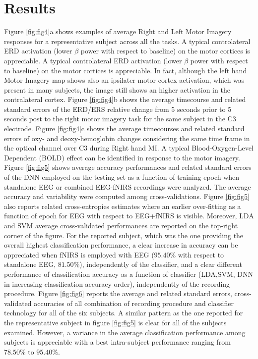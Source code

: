 \documentclass[12pt]{iopart}
\begin{document}
\section{Results}
Figure \ref{fig:fig4}a shows examples of average Right and Left Motor Imagery responses for a representative subject across all the tasks.
A typical controlateral ERD activation (lower $\beta$ power with respect to baseline) on the motor cortices is appreciable.
A typical controlateral ERD activation (lower $\beta$ power with respect to baseline) on the motor cortices is appreciable.
In fact, although the left hand Motor Imagery  map shows also an ipsilater motor cortex activation, which was present in many subjects, the image still shows an higher activation in the contralateral cortex.
Figure \ref{fig:fig4}b shows the average timecourse and related standard errors of the ERD/ERS relative change from 5 seconds prior to 5 seconds post to the right motor imagery task for the same subject in the C3 electrode. Figure \ref{fig:fig4}c shows the average timecourses and related standard errors of oxy- and deoxy-hemoglobin changes considering the same time frame in the optical channel over C3 during Right hand MI. A typical Blood-Oxygen-Level Dependent (BOLD) effect can be identified in response to the motor imagery. 
Figure \ref{fig:fig5} shows average accuracy performances and related standard errors
of the DNN employed on the testing set as a function of training epoch when standalone EEG or combined EEG-fNIRS recordings were analyzed. The average accuracy and variability were computed among cross-validations. 
Figure \ref{fig:fig5} also reports related cross-entropies estimates where an earlier over-fitting as a function of epoch for EEG with respect to EEG+fNIRS is visible.
Moreover, LDA and SVM average cross-validated performances are reported on the top-right corner of the figure.
For the reported subject, which was the one providing the overall highest classification performance, a clear increase in accuracy can be appreciated when fNIRS is employed with EEG ($95.40\%$ with respect to standalone EEG, $81.50\%$), independently of the classifier, and a clear different performance of classification accuracy as a function of classifier (LDA,SVM, DNN in increasing classification accuracy order), independently of the recording procedure.
Figure \ref{fig:fig6} reports the average and related standard errors, cross-validated accuracies of all combination of recording procedure and classifier technology for all of the six subjects. A similar pattern as the one reported for the representative subject in figure \ref{fig:fig5} is clear for all of the subjects examined. However, a variance in the average classification performance among subjects is appreciable with a best intra-subject performance ranging from $78.50\%$ to $95.40\%$. 
\end{document}
